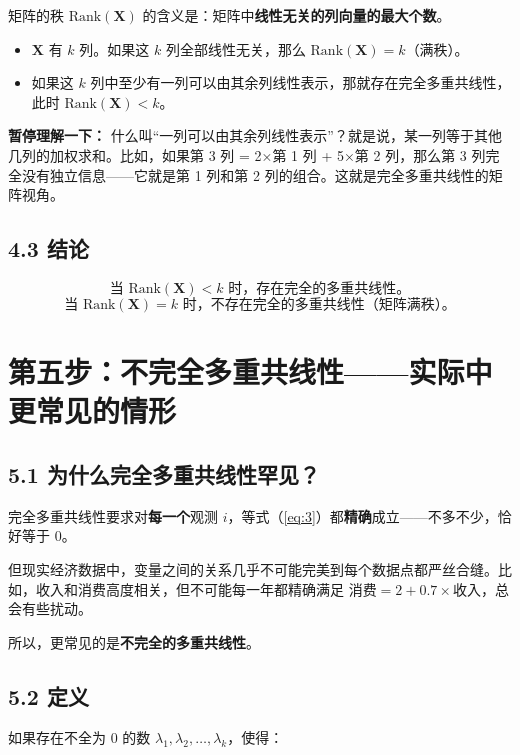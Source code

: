 \documentclass[12pt,a4paper]{ctexart}
\begin{document}
矩阵的秩 $\text{Rank}(\boldsymbol{X})$ 的含义是：矩阵中\textbf{线性无关的列向量的最大个数}。

\begin{itemize}
    \item $\boldsymbol{X}$ 有 $k$ 列。如果这 $k$ 列全部线性无关，那么 $\text{Rank}(\boldsymbol{X}) = k$（满秩）。
    \item 如果这 $k$ 列中至少有一列可以由其余列线性表示，那就存在完全多重共线性，此时 $\text{Rank}(\boldsymbol{X}) < k$。
\end{itemize}

\textbf{暂停理解一下：} 什么叫“一列可以由其余列线性表示”？就是说，某一列等于其他几列的加权求和。比如，如果第 3 列 = 2×第 1 列 + 5×第 2 列，那么第 3 列完全没有独立信息——它就是第 1 列和第 2 列的组合。这就是完全多重共线性的矩阵视角。

\subsection*{4.3 结论}

\[
\text{当 } \text{Rank}(\boldsymbol{X}) < k \text{ 时，存在完全的多重共线性。}
\]
\[
\text{当 } \text{Rank}(\boldsymbol{X}) = k \text{ 时，不存在完全的多重共线性（矩阵满秩）。}
\]

\section*{第五步：不完全多重共线性——实际中更常见的情形}

\subsection*{5.1 为什么完全多重共线性罕见？}

完全多重共线性要求对\textbf{每一个}观测 $i$，等式（\ref{eq:3}）都\textbf{精确}成立——不多不少，恰好等于 0。

但现实经济数据中，变量之间的关系几乎不可能完美到每个数据点都严丝合缝。比如，收入和消费高度相关，但不可能每一年都精确满足 $消费 = 2 + 0.7 \times 收入$，总会有些扰动。

所以，更常见的是\textbf{不完全的多重共线性}。

\subsection*{5.2 定义}

如果存在不全为 0 的数 $\lambda_1, \lambda_2, \ldots, \lambda_k$，使得：
\end{document}
